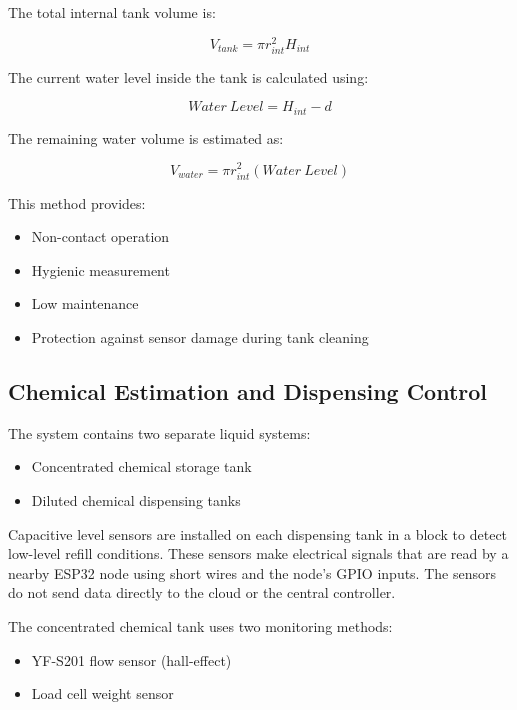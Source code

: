 \documentclass[12pt,a4paper]{report}
\begin{document}
The total internal tank volume is:

\begin{equation}
V_{tank} = \pi r_{int}^{2} H_{int}
\end{equation}

The current water level inside the tank is calculated using:

\begin{equation}
Water\ Level = H_{int} - d
\end{equation}

The remaining water volume is estimated as:

\begin{equation}
V_{water} = \pi r_{int}^{2} (Water\ Level)
\end{equation}

This method provides:

\begin{itemize}
    \item Non-contact operation
    \item Hygienic measurement
    \item Low maintenance
    \item Protection against sensor damage during tank cleaning
\end{itemize}

\subsection{Chemical Estimation and Dispensing Control}

The system contains two separate liquid systems:

\begin{itemize}
    \item Concentrated chemical storage tank
    \item Diluted chemical dispensing tanks
\end{itemize}

\noindent Capacitive level sensors are installed on each dispensing tank in a block to detect low-level refill conditions. These sensors make electrical signals that are read by a nearby ESP32 node using short wires and the node's GPIO inputs. The sensors do not send data directly to the cloud or the central controller.

\noindent The concentrated chemical tank uses two monitoring methods:

\begin{itemize}
    \item YF-S201 flow sensor (hall-effect)
    \item Load cell weight sensor
\end{itemize}
\end{document}
